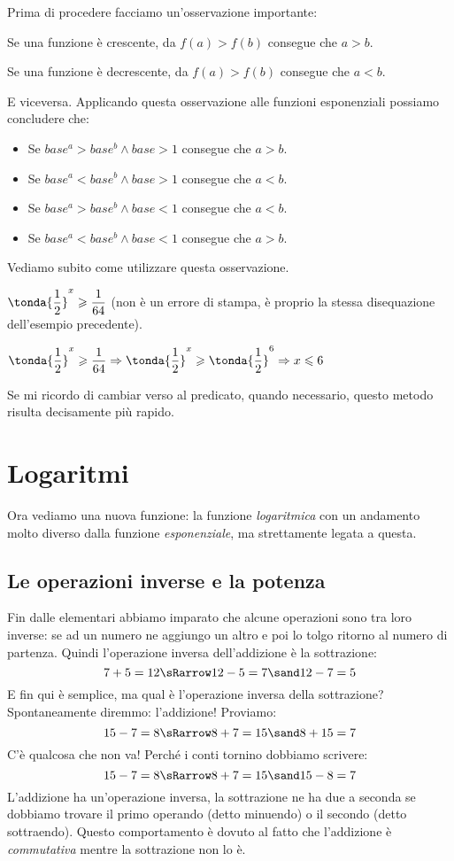 Prima di procedere facciamo un'osservazione importante: 

Se una funzione è crescente, da \(f(a)>f(b)\) consegue che \(a>b\).

Se una funzione è decrescente, da \(f(a)>f(b)\) consegue che \(a<b\).

E viceversa. Applicando questa osservazione alle funzioni esponenziali possiamo 
concludere che:

\begin{itemize}
 \item Se \(base^a>base^b \wedge base>1\) consegue che \(a>b\).
 \item Se \(base^a<base^b \wedge base>1\) consegue che \(a<b\).
 \item Se \(base^a>base^b \wedge base<1\) consegue che \(a<b\).
 \item Se \(base^a<base^b \wedge base<1\) consegue che \(a>b\).
\end{itemize}

Vediamo subito come utilizzare questa osservazione.


\begin{esempio}
 \(\tonda{\dfrac{1}{2}}^x \geqslant \dfrac{1}{64}\) (non è un errore di stampa, 
è proprio la stessa disequazione dell'esempio precedente).
 
  \(\tonda{\dfrac{1}{2}}^x \geqslant \dfrac{1}{64} \Rightarrow
    \tonda{\dfrac{1}{2}}^x \geqslant \tonda{\dfrac{1}{2}}^6 \Rightarrow 
    x \leqslant 6\)
    
Se mi ricordo di cambiar verso al predicato, quando necessario, questo metodo 
risulta decisamente più rapido.
\end{esempio}

\section{Logaritmi}
\label{sec:esplog_logaritmi}

Ora vediamo una nuova funzione: la funzione \emph{logaritmica} con un andamento 
molto diverso dalla funzione \emph{esponenziale}, ma strettamente legata a 
questa.

\subsection{Le operazioni inverse e la potenza}
\label{subsec:esplog_operazioni_inverse}

Fin dalle elementari abbiamo imparato che alcune operazioni sono tra loro 
inverse: se ad un numero ne aggiungo un altro e poi lo tolgo ritorno al numero 
di partenza. Quindi l'operazione inversa dell'addizione è la sottrazione:
\[7 + 5 = 12 \sRarrow 12 - 5 = 7 \sand 12 - 7 = 5\]
E fin qui è semplice, ma qual è l'operazione inversa della sottrazione?
Spontaneamente diremmo: l'addizione! Proviamo:
\[15 - 7 = 8 \sRarrow 8 + 7 = 15 \sand 8 + 15 = 7\]
C'è qualcosa che non va! Perché i conti tornino dobbiamo scrivere:
\[15 - 7 = 8 \sRarrow 8 + 7 = 15 \sand 15 - 8 = 7\]
L'addizione ha un'operazione inversa, la sottrazione 
ne ha due a seconda se dobbiamo trovare il primo operando (detto minuendo) o il 
secondo (detto sottraendo). Questo comportamento è dovuto al fatto che 
l'addizione è \emph{commutativa} mentre la sottrazione non lo è.

